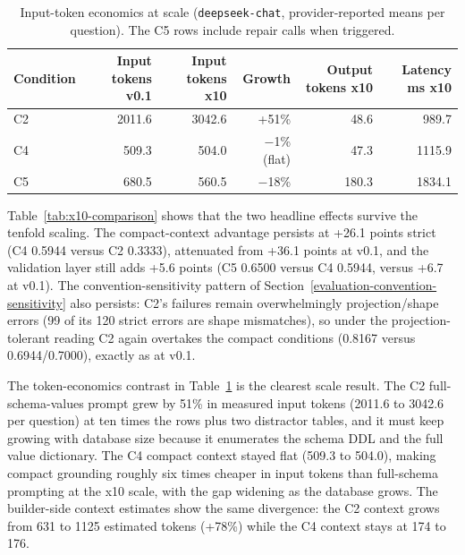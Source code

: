 \documentclass{ieeeaccess}
\begin{document}
\begin{table}[t]
\caption{Input-token economics at scale (\texttt{deepseek-chat}, provider-reported means per question). The C5 rows include repair calls when triggered.}
\label{tab:x10-tokens}
\centering
\small
\begin{tabular*}{\textwidth}{@{\extracolsep{\fill}}lrrrrr}
\toprule
Condition & Input tokens v0.1 & Input tokens x10 & Growth & Output tokens x10 & Latency ms x10 \\
\midrule
C2 & 2011.6 & 3042.6 & +51\% & 48.6 & 989.7 \\
C4 & 509.3 & 504.0 & $-$1\% (flat) & 47.3 & 1115.9 \\
C5 & 680.5 & 560.5 & $-$18\% & 180.3 & 1834.1 \\
\bottomrule
\end{tabular*}
\end{table}

Table~\ref{tab:x10-comparison} shows that the two headline effects survive the tenfold scaling. The compact-context advantage persists at +26.1 points strict (C4 0.5944 versus C2 0.3333), attenuated from +36.1 points at v0.1, and the validation layer still adds +5.6 points (C5 0.6500 versus C4 0.5944, versus +6.7 at v0.1). The convention-sensitivity pattern of Section~\ref{evaluation-convention-sensitivity} also persists: C2's failures remain overwhelmingly projection/shape errors (99 of its 120 strict errors are shape mismatches), so under the projection-tolerant reading C2 again overtakes the compact conditions (0.8167 versus 0.6944/0.7000), exactly as at v0.1.

The token-economics contrast in Table~\ref{tab:x10-tokens} is the clearest scale result. The C2 full-schema-values prompt grew by 51\% in measured input tokens (2011.6 to 3042.6 per question) at ten times the rows plus two distractor tables, and it must keep growing with database size because it enumerates the schema DDL and the full value dictionary. The C4 compact context stayed flat (509.3 to 504.0), making compact grounding roughly six times cheaper in input tokens than full-schema prompting at the x10 scale, with the gap widening as the database grows. The builder-side context estimates show the same divergence: the C2 context grows from 631 to 1125 estimated tokens (+78\%) while the C4 context stays at 174 to 176.
\end{document}
